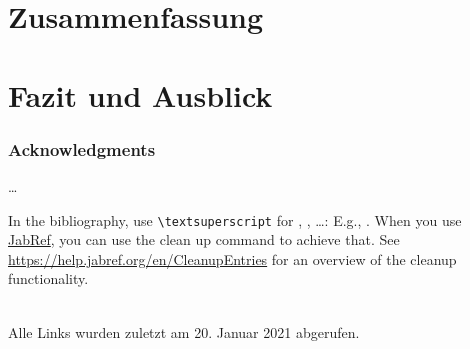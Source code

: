 \documentclass[english,runningheads,a4paper]{llncs}[2018/03/10]
\begin{document}
\section{Zusammenfassung}
\label{sec:summary}

\section{Fazit und Ausblick}
\label{sec:conclusion}

\subsubsection*{Acknowledgments}
\ldots

In the bibliography, use \texttt{\textbackslash textsuperscript} for , , \ldots:
E.g., .
When you use \href{https://www.jabref.org}{JabRef}, you can use the clean up command to achieve that.
See \url{https://help.jabref.org/en/CleanupEntries} for an overview of the cleanup functionality.

\renewcommand{\bibsection}{\section*{References}} %

\begingroup
  \ifluatex
  \else
  \fi
  \small %
  
\endgroup

\ \\
%
Alle Links wurden zuletzt am 20. Januar 2021 abgerufen.
\end{document}
